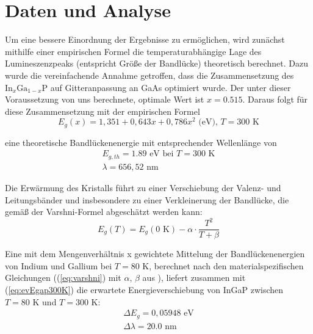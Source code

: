 \documentclass[aps,twocolumn,secnumarabic,nobalancelastpage,amsmath,amssymb,
nofootinbib,superscriptaddress]{revtex4-1}
\begin{document}

\section{Daten und Analyse}

\noindent Um eine bessere Einordnung der Ergebnisse zu ermöglichen, wird zunächst mithilfe einer empirischen
Formel die temperaturabhängige Lage des Lumineszenzpeaks (entspricht Größe der Bandlücke) theoretisch berechnet.
Dazu wurde die vereinfachende Annahme getroffen, dass die Zusammensetzung des $\text{In}_x\text{Ga}_{1-x}\text{P}$
auf Gitteranpassung an GaAs optimiert wurde. Der unter dieser Voraussetzung von uns berechnete,
optimale Wert ist $x=0.515$. Daraus folgt für diese Zusammensetzung mit der empirischen Formel \cite{vorbereitung}
\begin{equation}
  E_{g}(x) = 1,351+0,643x+0,786x^2\text{ (eV), }T=300\text{ K}
   \label{eq:Ex}
\end{equation}

\noindent eine theoretische Bandlückenenergie mit entsprechender Wellenlänge von
\begin{eqnarray}
  E_{g,th} = 1.89\text{ eV}\text{ bei }T=300\text{ K}
  \\
  \nonumber
  \lambda = 656,52\text{ nm}\qquad\qquad\quad\;
  \label{eq:evEgap300K}
\end{eqnarray}

\noindent Die Erwärmung des Kristalls führt zu einer Verschiebung der Valenz- und Leitungsbänder und insbesondere
zu einer Verkleinerung der Bandlücke, die gemäß der Varshni-Formel abgeschätzt werden kann:
\begin{equation}
  E_g(T) = E_g(0\text{ K})-\alpha\cdot\frac{T^2}{T+\beta}
   \label{eq:varshni}
\end{equation}

\noindent Eine mit dem Mengenverhältnis x gewichtete Mittelung der Bandlückenenergien von Indium und Gallium bei $T=80\text{ K}$, berechnet nach den
materialspezifischen Gleichungen ((\ref{eq:varshni}) mit $\alpha$, $\beta$ aus \cite{vorbereitung}), liefert zusammen mit (\ref{eq:evEgap300K})
die erwartete Energieverschiebung von InGaP zwischen $T=80\text{ K}$ und $T=300\text{ K}$:
\begin{eqnarray}
  \Delta E_g = 0,05948\text{ eV}
  \\
  \nonumber
  \Delta\lambda = 20.0\text{ nm}\;\;\;\;\,\,
\label{eq:evVersch}
\end{eqnarray}
\end{document}
